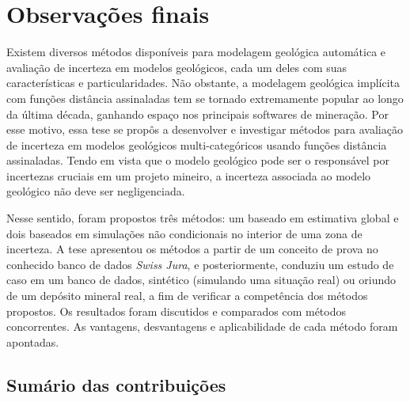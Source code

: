 \chapter{Observações finais}

Existem diversos métodos disponíveis para modelagem geológica automática e avaliação de incerteza em modelos geológicos, cada um deles com suas características e particularidades. Não obstante, a modelagem geológica implícita com funções distância assinaladas tem se tornado extremamente popular ao longo da última década, ganhando espaço nos principais softwares de mineração. Por esse motivo, essa tese se propôs a desenvolver e investigar métodos para avaliação de incerteza em modelos geológicos multi-categóricos usando funções distância assinaladas. Tendo em vista que o modelo geológico pode ser o responsável por incertezas cruciais em um projeto mineiro, a incerteza associada ao modelo geológico não deve ser negligenciada.

Nesse sentido, foram propostos três métodos: um baseado em estimativa global e dois baseados em simulações não condicionais no interior de uma zona de incerteza. A tese apresentou os métodos a partir de um conceito de prova no conhecido banco de dados \textit{Swiss Jura}, e posteriormente, conduziu um estudo de caso em um banco de dados, sintético (simulando uma situação real) ou oriundo de um depósito mineral real, a fim de verificar a competência dos métodos propostos. Os resultados foram discutidos e comparados com métodos concorrentes. As vantagens, desvantagens e aplicabilidade de cada método foram apontadas.

\section{Sumário das contribuições}

